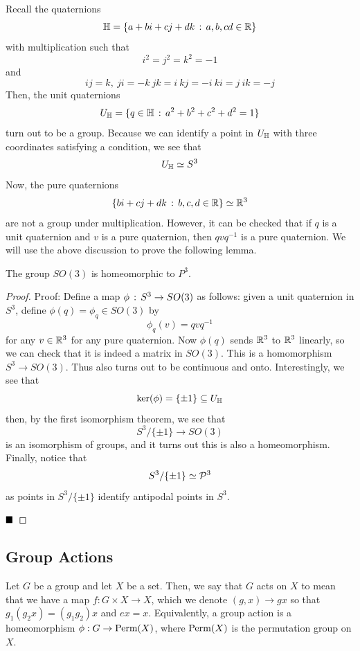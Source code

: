 
Recall the quaternions
\[ \bb{H} = \{a + bi + cj + dk \col a, b, c d \in \R\} \]
with multiplication such that
\[ i^2 = j^2 = k^2 = -1 \]
and
\[ ij = k,\ ji = -k\ jk = i\ kj = -i\ ki = j\ ik = -j \]
Then, the unit quaternions
\[ U_{\bb{H}} = \{q \in \bb{H} \col a^2 + b^2 + c^2 + d^2 = 1\} \]
turn out to be a group. Because we can identify a point in $U_{\bb{H}}$ with three coordinates satisfying a condition, we see that
\[ U_{\bb{H}} \simeq S^3 \]
Now, the pure quaternions
\[ \{bi + cj + dk \col b, c, d \in \R\} \simeq \R^3 \]
are not a group under multiplication. However, it can be checked that if $q$ is a unit quaternion and $v$ is a pure quaternion, then $qvq^{-1}$ is a pure quaternion. We will use the above discussion to prove the following lemma. 

\begin{lemma}
    The group $SO(3)$ is homeomorphic to $P^3$. 
\end{lemma}
\begin{proof}{Proof:}
    Define a map $\phi \col S^3 \to SO(3)$ as follows: given a unit quaternion in $S^3$, define $\phi(q) = \phi_{q} \in SO(3)$ by
    \[ \phi_{q}(v) = qvq^{-1} \]
    for any $v \in \R^3$ for any pure quaternion. Now $\phi(q)$ sends $\R^3$ to $\R^3$ linearly, so we can check that it is indeed a matrix in $SO(3)$. This is a homomorphism $S^3 \to SO(3)$. Thus also turns out to be continuous and onto. Interestingly, we see that
    \[ \ker(\phi) = \{\pm 1\} \subseteq U_{\bb{H}} \]
    then, by the first isomorphism theorem, we see that
    \[ S^{3} / \{\pm 1\} \to SO(3) \]
    is an isomorphism of groups, and it turns out this is also a homeomorphism. Finally, notice that
    \[ S^{3}/ \{\pm 1\} \simeq \P^{3} \]
    as points in $S^3 / \{\pm 1\}$ identify antipodal points in $S^3$. 

    $\qed$
\end{proof}

\subsection*{Group Actions}
\sectionspace

Let $G$ be a group and let $X$ be a set. Then, we say that $G$ acts on $X$ to mean that we have a map $f : G \times X \to X$, which we denote $(g, x) \to gx$ so that $g_1(g_2x) = (g_1g_2)x$ and $ex = x$. Equivalently, a group action is a homeomorphism $\phi : G \to \tt{Perm}(X)$, where $\tt{Perm}(X)$ is the permutation group on $X$.\\

